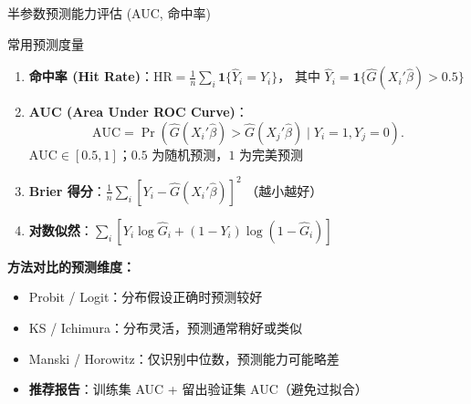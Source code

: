 \documentclass[aspectratio=169, 10pt]{beamer}
\begin{document}
\begin{frame}{半参数预测能力评估 (AUC, 命中率)}

  \begin{definitionbox}{{常用预测度量}}
    \begin{enumerate}\setlength{\itemsep}{1pt}
      \item \textbf{命中率 (Hit Rate)}：$\text{HR} = \frac{1}{n}\sum_i \mathbf{1}\{\hat Y_i = Y_i\}$，
      其中 $\hat Y_i = \mathbf{1}\{\hat G(X_i'\hat\beta) > 0.5\}$
      \item \textbf{AUC (Area Under ROC Curve)}：
      $$\text{AUC} = \Pr(\hat G(X_i'\hat\beta) > \hat G(X_j'\hat\beta) \mid Y_i = 1, Y_j = 0).$$
      $\text{AUC} \in [0.5, 1]$；$0.5$ 为随机预测，$1$ 为完美预测
      \item \textbf{Brier 得分}：$\frac{1}{n}\sum_i [Y_i - \hat G(X_i'\hat\beta)]^2$
      （越小越好）
      \item \textbf{对数似然}：$\sum_i [Y_i \log \hat G_i + (1-Y_i)\log(1-\hat G_i)]$
    \end{enumerate}
  \end{definitionbox}

  \begin{highlightbox}
    \textbf{方法对比的预测维度：}
    \begin{itemize}\setlength{\itemsep}{1pt}
      \item Probit / Logit：分布假设正确时预测较好
      \item KS / Ichimura：分布灵活，预测通常稍好或类似
      \item Manski / Horowitz：仅识别中位数，预测能力可能略差
      \item \textbf{推荐报告}：训练集 AUC + 留出验证集 AUC（避免过拟合）
    \end{itemize}
  \end{highlightbox}

\end{frame}
\end{document}
